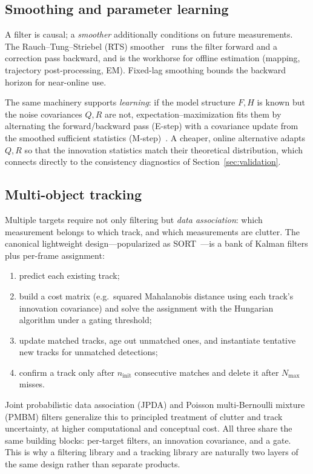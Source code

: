 \documentclass[10pt,conference]{IEEEtran}
\begin{document}
\subsection{Smoothing and parameter learning}

A filter is causal; a \emph{smoother} additionally conditions on future
measurements. The Rauch--Tung--Striebel (RTS) smoother~\cite{rauch1965maximum}
runs the filter forward and a correction pass backward, and is the workhorse
for offline estimation (mapping, trajectory post-processing, EM). Fixed-lag
smoothing bounds the backward horizon for near-online use.

The same machinery supports \emph{learning}: if the model structure $F,H$ is
known but the noise covariances $Q,R$ are not, expectation--maximization
fits them by alternating the forward/backward pass (E-step) with a
covariance update from the smoothed sufficient statistics
(M-step)~\cite{shumway1982}. A cheaper, online alternative adapts $Q,R$ so
that the innovation statistics match their theoretical distribution, which
connects directly to the consistency diagnostics of
Section~\ref{sec:validation}.

\subsection{Multi-object tracking}

Multiple targets require not only filtering but \emph{data association}: which
measurement belongs to which track, and which measurements are clutter. The
canonical lightweight design---popularized as SORT~\cite{bewley2016sort}---is
a bank of Kalman filters plus per-frame assignment:
\begin{enumerate}
\item predict each existing track;
\item build a cost matrix (e.g.\ squared Mahalanobis distance using each
track's innovation covariance) and solve the assignment with the Hungarian
algorithm under a gating threshold;
\item update matched tracks, age out unmatched ones, and instantiate tentative
new tracks for unmatched detections;
\item confirm a track only after $n_{\mathrm{init}}$ consecutive matches and
delete it after $N_{\max}$ misses.
\end{enumerate}
Joint probabilistic data association (JPDA) and Poisson multi-Bernoulli
mixture (PMBM) filters generalize this to principled treatment of clutter and
track uncertainty, at higher computational and conceptual cost. All three
share the same building blocks: per-target filters, an innovation
covariance, and a gate. This is why a filtering library and a tracking
library are naturally two layers of the same design rather than separate
products.
\end{document}
